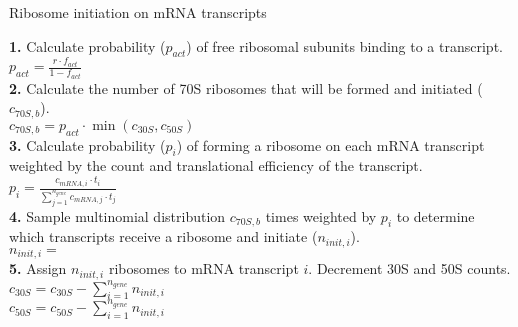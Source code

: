 \documentclass[12pt]{article}
\begin{document}
\begin{algorithm}[H]
\caption{Ribosome initiation on mRNA transcripts}
\label{polypeptide_initiation_algorithm}


  \textbf{1.} Calculate probability ($p_{act}$) of free ribosomal subunits binding to a transcript.\\
    \-\hspace{1cm} $p_{act} = \frac{r \cdot f_{act}}{1 - f_{act}}$\\
  \textbf{2.} Calculate the number of 70S ribosomes that will be formed and initiated ($c_{70S, b}$).\\
    \-\hspace{1cm} $c_{70S, b} = p_{act} \cdot \min(c_{30S}, c_{50S})$\\
  \textbf{3.} Calculate probability ($p_i$) of forming a ribosome on each mRNA transcript weighted by the count and translational efficiency of the transcript.\\
    \-\hspace{1cm} $p_i = \frac{c_{mRNA,i} \cdot t_i}{\sum\limits^{n_{gene}}_{j=1} c_{mRNA,j} \cdot t_j}$\\
  \textbf{4.} Sample multinomial distribution $c_{70S, b}$ times weighted by $p_i$ to determine which transcripts receive a ribosome and initiate ($n_{init,i}$).\\
    \-\hspace{1cm} $n_{init,i} =$ \\
  \textbf{5.} Assign $n_{init,i}$ ribosomes to mRNA transcript $i$. Decrement 30S and 50S counts.\\
    \-\hspace{1cm} $c_{30S} = c_{30S} - \sum\limits^{n_{gene}}_{i=1} n_{init,i}$\\
    \-\hspace{1cm} $c_{50S} = c_{50S} - \sum\limits^{n_{gene}}_{i=1} n_{init,i}$\\

\end{algorithm}
\end{document}
